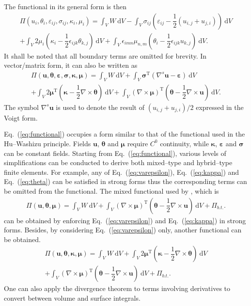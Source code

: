 \documentclass[3p,sort&compress,11pt,fleqn,review]{elsarticle}
\newcommand*{\eqsref}[1]{Eq.~(\ref{#1})}
\newcommand*{\mb}[1]{\boldsymbol{#1}}
\newcommand*{\mT}{\mathrm{T}}
\newcommand*{\md}[1]{\mathrm{d}#1}
\begin{document}
The functional in its general form is then
\begin{multline}
\varPi\left(u_i,\theta_i,\varepsilon_{ij},\sigma_{ij},\kappa_i,\mu_i\right)=\int_VW~\md{V}
-\int_V\sigma_{ij}\left(\varepsilon_{ij}-\dfrac{1}{2}\left(u_{i,j}+u_{j,i}\right)\right)~\md{V}\\
+\int_V2\mu_i\left(\kappa_i-\dfrac{1}{2}\epsilon_{ijk}\theta_{k,j}\right)~\md{V}
+\int_V\epsilon_{imn}\mu_{n,m}\left(\theta_i-\dfrac{1}{2}\epsilon_{ijk}u_{k,j}\right)~\md{V}.
\end{multline}
It shall be noted that all boundary terms are omitted for brevity. In vector/matrix form, it can also be written as
\begin{multline}\label{eq:functional}
\varPi\left(\mb{u},\mb{\theta},\mb{\varepsilon},\mb{\sigma},\mb{\kappa},\mb{\mu}\right)=\int_VW~\md{V}
+\int_V\mb{\sigma}^\mT\left(\nabla^s\mb{u}-\mb{\varepsilon}\right)~\md{V}\\
+\int_V2\mb{\mu}^\mT\left(\mb{\kappa}-\dfrac{1}{2}\nabla\times\mb{\theta}\right)~\md{V}
+\int_V\left(\nabla\times\mb{\mu}\right)^\mT\left(\mb{\theta}-\dfrac{1}{2}\nabla\times\mb{u}\right)~\md{V}.
\end{multline}
The symbol $\nabla^s\mb{u}$ is used to denote the result of $\left(u_{i,j}+u_{j,i}\right)/2$ expressed in the Voigt form.

\eqsref{eq:functional} occupies a form similar to that of the functional used in the Hu--Washizu principle. Fields $\mb{u}$, $\mb{\theta}$ and $\mb{\mu}$ require $C^0$ continuity, while $\mb{\kappa}$, $\mb{\varepsilon}$ and $\mb{\sigma}$ can be constant fields. Starting from \eqsref{eq:functional}, various levels of simplifications can be conducted to derive both mixed--type and hybrid--type finite elements. For example, any of \eqsref{eq:varepsilon}, \eqsref{eq:kappa} and \eqsref{eq:theta} can be satisfied in strong forms thus the corresponding terms can be omitted from the functional. The mixed functional used by \citet{Darrall2013}, which is
\begin{gather}
\varPi\left(\mb{u},\mb{\theta},\mb{\mu}\right)=\int_VW~\md{V}
+\int_V\left(\nabla\times\mb{\mu}\right)^\mT\left(\mb{\theta}-\dfrac{1}{2}\nabla\times\mb{u}\right)~\md{V}+\varPi_{b.t.}.
\end{gather}
can be obtained by enforcing \eqsref{eq:varepsilon} and \eqsref{eq:kappa} in strong forms. Besides, by considering \eqsref{eq:varepsilon} only, another functional can be obtained.
\begin{multline}
\varPi\left(\mb{u},\mb{\theta},\mb{\kappa},\mb{\mu}\right)=\int_VW~\md{V}
+\int_V2\mb{\mu}^\mT\left(\mb{\kappa}-\dfrac{1}{2}\nabla\times\mb{\theta}\right)~\md{V}\\
+\int_V\left(\nabla\times\mb{\mu}\right)^\mT\left(\mb{\theta}-\dfrac{1}{2}\nabla\times\mb{u}\right)~\md{V}+\varPi_{b.t.}.
\end{multline}
One can also apply the divergence theorem to terms involving derivatives to convert between volume and surface integrals.
\end{document}
